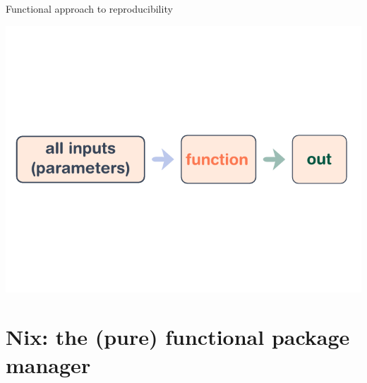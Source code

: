 \documentclass[aspectratio=169]{beamer}
\begin{document}
\begin{frame}{Functional approach to reproducibility}
    \begin{center}
        \includegraphics[height=0.98\textheight]{img/schema-build-functional-correct.pdf}
    \end{center}
\end{frame}

\section{Nix: the (pure) functional package manager}
\end{document}
